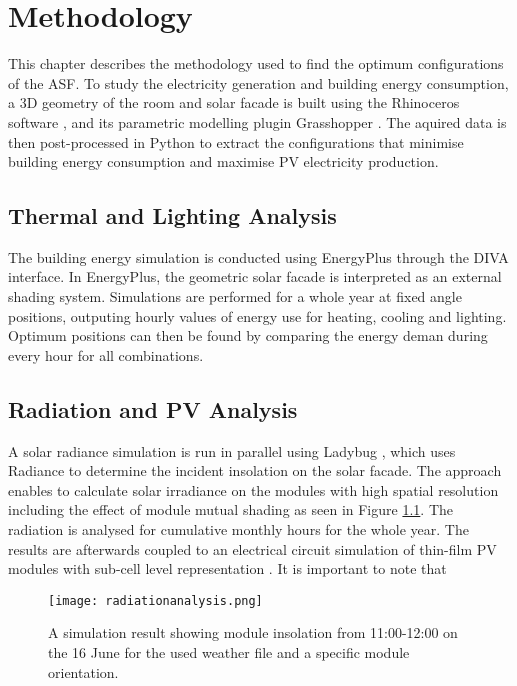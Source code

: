 \chapter{Methodology}

	This chapter describes the methodology used to find the optimum configurations of the ASF. To study the electricity generation and building energy consumption, a 3D geometry of the room and solar facade is built using the Rhinoceros software \cite{Rhino}, and its parametric modelling plugin Grasshopper \cite{grasshopper}. The aquired data is then post-processed in Python \cite{python} to extract the configurations that minimise building energy consumption and maximise PV electricity production.

	\section{Thermal and Lighting Analysis}

		The building energy simulation is conducted using EnergyPlus \cite{energyplus} through the DIVA \cite{DIVA} interface. In EnergyPlus, the geometric solar facade is interpreted as an external shading system. Simulations are performed for a whole year at fixed angle positions, outputing hourly values of energy use for heating, cooling and lighting. Optimum positions can then be found by comparing the energy deman during every hour for all combinations. 

	\section{Radiation and PV Analysis}

		A solar radiance simulation is run in parallel using Ladybug \cite{roudsari2014ladybug},  which uses Radiance \cite{ward1994radiance} to determine the incident insolation on the solar facade. The approach enables to calculate solar irradiance on the modules with high spatial resolution including the effect of module mutual shading as seen in Figure \ref{fig:radiation}. The radiation is analysed for cumulative monthly hours for the whole year. The results are afterwards coupled to an electrical circuit simulation of thin-film PV modules with sub-cell level representation \cite{hofer2015PVSEC}. It is important to note that 

		\begin{figure}[H]
		\begin{center}
			\texttt{[image: radiationanalysis.png]}
			\caption{A simulation result showing module insolation from 11:00-12:00 on the 16 June for the used weather file and a specific module orientation.}
			\label{fig:radiation}
		\end{center}
		\end{figure}


